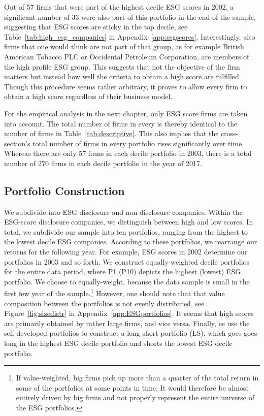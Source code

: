 \documentclass[11pt]{article}
\begin{document}
Out of 57 firms that were part of the highest decile ESG scores in 2002, a significant number of 33 were also part of this portfolio in the end of the sample, suggesting that ESG scores are sticky in the top decile, see Table~\ref{tab:high_esg_companies} in Appendix~\ref{app:esgscores}. Interestingly, also firms that one would think are not part of that group, as for example British American Tobacco PLC or Occidental Petroleum Corporation, are members of the high profile ESG group. This suggests that not the objective of the firm matters but instead how well the criteria to obtain a high score are fulfilled. Though this procedure seems rather arbitrary, it proves to allow every firm to obtain a high score regardless of their business model.

For the empirical analysis in the next chapter, only ESG score firms are taken into account. The total number of firms in every is thereby identical to the number of firms in Table~\ref{tab:descriptive}. This also implies that the cross-section's total number of firms in every portfolio rises significantly over time. Whereas there are only 57 firms in each decile portfolio in 2003, there is a total number of 270 firms in each decile portfolio in the year of 2017.

\subsection{Portfolio Construction}

We subdivide into ESG disclosure and non-disclosure companies. Within the ESG-score disclosure companies, we distinguish between high and low scores. In total, we subdivide our sample into ten portfolios, ranging from the highest to the lowest decile ESG companies. According to these portfolios, we rearrange our returns for the following year. For example, ESG scores in 2002 determine our portfolios in 2003 and so forth. We construct  equally-weighted decile portfolios for the entire data period, where P1 (P10) depicts the highest (lowest) ESG portfolio. We choose to equally-weight, because the data sample is small in the first few year of the sample.\footnote{If value-weighted, big firms pick up more than a quarter of the total return in some of the portfolios at some points in time. It would therefore be almost entirely driven by big firms and not properly represent the entire universe of the ESG portfolios.} However, one should note that that value composition between the portfolios is not evenly distributed, see Figure~\ref{fig:sizedistr} in Appendix~\ref{app:ESGportfolios}. It seems that high scores are primarily obtained by rather large firms, and vice versa. Finally, ee use the self-developed portfolios to construct a long-short portfolio (LS), which goes goes long in the highest ESG decile portfolio and shorts the lowest ESG decile portfolio. 
\end{document}

